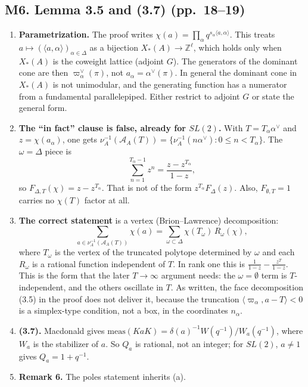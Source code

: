 \documentclass[11pt]{article}
\newcommand{\cA}{\mathcal{A}}
\newcommand{\ip}[1]{\langle #1\rangle}
\begin{document}
\subsection*{M6. Lemma 3.5 and (3.7) (pp.~18--19)}
\begin{enumerate}[label=(\alph*)]
\item \textbf{Parametrization.} The proof writes $\chi(a)=\prod_\alpha q^{s_\alpha\ip{a,\alpha}}$. This treats $a\mapsto(\ip{a,\alpha})_{\alpha\in\Delta}$ as a bijection $X_*(A)\to\mathbb{Z}^\ell$, which holds only when $X_*(A)$ is the coweight lattice (adjoint $G$). The generators of the dominant cone are then $\varpi_\alpha^\vee(\pi)$, not $a_\alpha=\alpha^\vee(\pi)$. In general the dominant cone in $X_*(A)$ is not unimodular, and the generating function has a numerator from a fundamental parallelepiped. Either restrict to adjoint $G$ or state the general form.
\item \textbf{The ``in fact'' clause is false, already for $SL(2)$.} With $T=T_\alpha\alpha^\vee$ and $z=\chi(a_\alpha)$, one gets $\nu_A^{-1}(\cA_A(T))=\{\nu_A^{-1}(n\alpha^\vee):0\le n<T_\alpha\}$. The $\omega=\Delta$ piece is
\[\sum_{n=1}^{T_\alpha-1}z^n=\frac{z-z^{T_\alpha}}{1-z},\]
so $F_{\Delta,T}(\chi)=z-z^{T_\alpha}$. That is not of the form $z^{T_\alpha}F_\Delta(z)$. Also, $F_{\emptyset,T}=1$ carries no $\chi(T)$ factor at all.
\item \textbf{The correct statement} is a vertex (Brion--Lawrence) decomposition:
\[\sum_{a\in\nu_A^{-1}(\cA_A(T))}\chi(a)=\sum_{\omega\subset\Delta}\chi(T_\omega)\,R_\omega(\chi),\]
where $T_\omega$ is the vertex of the truncated polytope determined by $\omega$ and each $R_\omega$ is a rational function independent of $T$. In rank one this is $\frac{1}{1-z}-\frac{z^{T}}{1-z}$. This is the form that the later $T\to\infty$ argument needs: the $\omega=\emptyset$ term is $T$-independent, and the others oscillate in $T$. As written, the face decomposition (3.5) in the proof does not deliver it, because the truncation $\ip{\varpi_\alpha,a-T}<0$ is a simplex-type condition, not a box, in the coordinates $n_\alpha$.
\item \textbf{(3.7).} Macdonald gives $\mathrm{meas}(KaK)=\delta(a)^{-1}W(q^{-1})/W_a(q^{-1})$, where $W_a$ is the stabilizer of $a$. So $Q_a$ is rational, not an integer; for $SL(2)$, $a\ne1$ gives $Q_a=1+q^{-1}$.
\item \textbf{Remark 6.} The poles statement inherits (a).
\end{enumerate}
\end{document}
